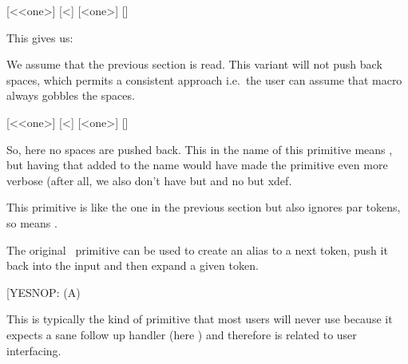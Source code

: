 \startbuffer
\def\variantone<#1>{(#1)}
\def\varianttwo{}
\def\temp{\futureexpand<\variantone\varianttwo}
[\temp <one>]
[\temp {two}]
[\expandafter\temp\space <one>]
[\expandafter\temp{}]
\stopbuffer

\typebuffer

This gives us:

{\getbuffer}

\stopnewprimitive

\startnewprimitive[title={\prm {futureexpandis}}]

We assume that the previous section is read. This variant will not push back
spaces, which permits a consistent approach i.e.\ the user can assume that macro
always gobbles the spaces.

\startbuffer
\def\variantone<#1>{(#1)}
\def\varianttwo{}
\def\temp{\futureexpandis<\variantone\varianttwo}
[\temp <one>]
[\temp {two}]
[\expandafter\temp\space <one>]
[\expandafter\temp{}]
\stopbuffer

\typebuffer

So, here no spaces are pushed back. This  in the name of this primitive
means , but having that added to the name would have made
the primitive even more verbose (after all, we also don't have \type
{\expandeddef} but  and no \type {\globalexpandeddef} but \prm
{xdef}.

{\getbuffer}

\stopnewprimitive

\startnewprimitive[title={\prm {futureexpandisap}}]

This primitive is like the one in the previous section but also ignores par
tokens, so  means .

\stopnewprimitive

\startoldprimitive[title={\prm {futurelet}}]

The original \TEX\ primitive  can be used to create an alias to a next token,
push it back into the input and then expand a given token.

\startbuffer
\let\MySpecialTokenL[
\let\MySpecialTokenR] %
\def\DoWhatever{\ifx\NextToken\MySpecialTokenL YES\else NOP\fi : }
\futurelet\NextToken\DoWhatever [A]\crlf
\futurelet\NextToken\DoWhatever (A)\par
\stopbuffer

\typebuffer

This is typically the kind of primitive that most users will never use because it
expects a sane follow up handler (here \type {\DoWhatever}) and therefore is
related to user interfacing.

